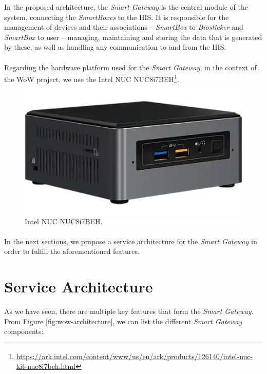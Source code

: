 

In the proposed architecture, the \textit{Smart Gateway} is the central module of the system, connecting the \textit{SmartBoxes} to the \acs{HIS}. It is responsible for the management of devices and their associations -- \textit{SmartBox} to \textit{Biosticker} and \textit{SmartBox} to user -- managing, maintaining and storing the data that is generated by these, as well as handling any communication to and from the \acs{HIS}. 


\paragraph{} Regarding the hardware platform used for the \textit{Smart Gateway}, in the context of the \acs{WoW} project, we use the Intel NUC NUC8i7BEH\footnote{\url{https://ark.intel.com/content/www/us/en/ark/products/126140/intel-nuc-kit-nuc8i7beh.html}}.

\begin{figure}[H]
    \centering
    \includegraphics[width=0.4\linewidth]{images/gateway-image.png}
    \caption[Intel NUC NUC8i7BEH.]{Intel NUC NUC8i7BEH.}
    \label{fig:gateway_image}
\end{figure}


\paragraph{} In the next sections, we propose a service architecture for the \textit{Smart Gateway} in order to fulfill the aforementioned features.



\section{Service Architecture}

As we have seen, there are multiple key features that form the \textit{Smart Gateway}. From Figure \ref{fig:wow-architecture}, we can list the different \textit{Smart Gateway} components:  

